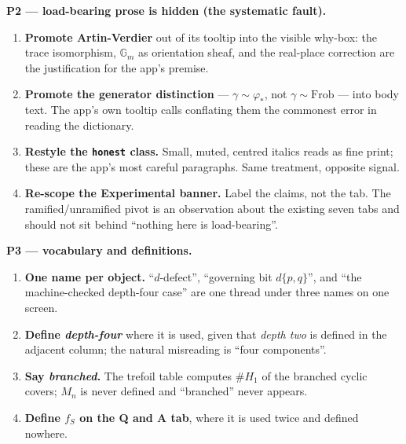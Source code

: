 \documentclass[11pt]{article}
\begin{document}
\textbf{P2 --- load-bearing prose is hidden (the systematic fault).}
\begin{enumerate}[leftmargin=1.4em,itemsep=2pt,resume]
\item \textbf{Promote Artin-Verdier} out of its tooltip into the visible why-box: the trace isomorphism, $\mathbb{G}_m$ as orientation sheaf, and the real-place correction are the justification for the app's premise.
\item \textbf{Promote the generator distinction} --- $\gamma \sim \varphi_*$, not $\gamma \sim \mathrm{Frob}$ --- into body text. The app's own tooltip calls conflating them the commonest error in reading the dictionary.
\item \textbf{Restyle the \texttt{honest} class.} Small, muted, centred italics reads as fine print; these are the app's most careful paragraphs. Same treatment, opposite signal.
\item \textbf{Re-scope the Experimental banner.} Label the claims, not the tab. The ramified/unramified pivot is an observation about the existing seven tabs and should not sit behind ``nothing here is load-bearing''.
\end{enumerate}

\textbf{P3 --- vocabulary and definitions.}
\begin{enumerate}[leftmargin=1.4em,itemsep=2pt,resume]
\item \textbf{One name per object.} ``$d$-defect'', ``governing bit $d\{p,q\}$'', and ``the machine-checked depth-four case'' are one thread under three names on one screen.
\item \textbf{Define \emph{depth-four}} where it is used, given that \emph{depth two} is defined in the adjacent column; the natural misreading is ``four components''.
\item \textbf{Say \emph{branched}.} The trefoil table computes $\#H_1$ of the branched cyclic covers; $M_n$ is never defined and ``branched'' never appears.
\item \textbf{Define $f_S$ on the Q and A tab}, where it is used twice and defined nowhere.
\end{enumerate}
\end{document}
